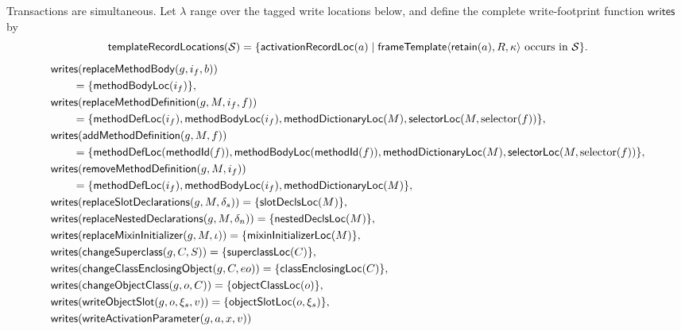 Transactions are simultaneous.  Let $\lambda$ range over the tagged write
locations below, and define the complete write-footprint function
$\mathsf{writes}$ by
{\footnotesize
\begin{equation}\label{eq:stack-template-record-locations}
 \mathsf{templateRecordLocations}(\mathcal S)=
 \{\mathsf{activationRecordLoc}(a)\mid
   \mathsf{frameTemplate}\langle\mathsf{retain}(a),R,\kappa\rangle
      \text{ occurs in }\mathcal S\}.
\end{equation}
}
{\small
\begin{equation}\label{eq:reflection-command-footprint}
\begin{aligned}
 &\mathsf{writes}(\kw{replaceMethodBody}(g,i_f,b))\\
 &\qquad=\{\kw{methodBodyLoc}(i_f)\},\\
 &\mathsf{writes}(\kw{replaceMethodDefinition}(g,M,i_f,f))\\
 &\qquad=\{\kw{methodDefLoc}(i_f),\kw{methodBodyLoc}(i_f),
       \kw{methodDictionaryLoc}(M),
       \kw{selectorLoc}(M,\selector(f))\},\\
 &\mathsf{writes}(\kw{addMethodDefinition}(g,M,f))\\
 &\qquad=\{\kw{methodDefLoc}(\mathsf{methodId}(f)),
       \kw{methodBodyLoc}(\mathsf{methodId}(f)),
       \kw{methodDictionaryLoc}(M),
       \kw{selectorLoc}(M,\selector(f))\},\\
 &\mathsf{writes}(\kw{removeMethodDefinition}(g,M,i_f))\\
 &\qquad=\{\kw{methodDefLoc}(i_f),\kw{methodBodyLoc}(i_f),
       \kw{methodDictionaryLoc}(M)\},\\
 &\mathsf{writes}(\kw{replaceSlotDeclarations}(g,M,\delta_s))
  =\{\kw{slotDeclsLoc}(M)\},\\
 &\mathsf{writes}(\kw{replaceNestedDeclarations}(g,M,\delta_n))
  =\{\kw{nestedDeclsLoc}(M)\},\\
 &\mathsf{writes}(\kw{replaceMixinInitializer}(g,M,\iota))
  =\{\kw{mixinInitializerLoc}(M)\},\\
 &\mathsf{writes}(\kw{changeSuperclass}(g,C,S))
  =\{\kw{superclassLoc}(C)\},\\
 &\mathsf{writes}(\kw{changeClassEnclosingObject}(g,C,eo))
  =\{\kw{classEnclosingLoc}(C)\},\\
 &\mathsf{writes}(\kw{changeObjectClass}(g,o,C))
  =\{\kw{objectClassLoc}(o)\},\\
 &\mathsf{writes}(\kw{writeObjectSlot}(g,o,\xi_s,v))
  =\{\kw{objectSlotLoc}(o,\xi_s)\},\\
 &\mathsf{writes}(\kw{writeActivationParameter}(g,a,x,v))\\

\end{aligned}
\end{equation}}
